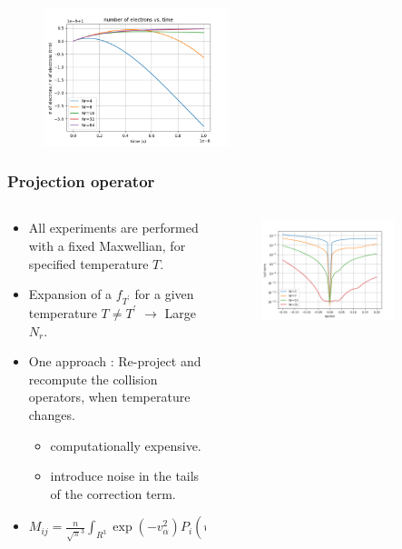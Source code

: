 \documentclass[mathserif, aspectratio=169]{beamer}
\begin{document}
\begin{frame}
\begin{figure}
{			}
			\only<+>
			{
				\includegraphics[width=0.48\textwidth]{g02_mw_mass.png}
			}
		\end{figure}
	\end{frame}


	\begin{frame}
		\frametitle{Projection operator}
		\begin{columns}
			\begin{column}{0.45\textwidth}
				\begin{itemize}
					\item All experiments are performed with a fixed Maxwellian, for specified temperature $T$. 
					\item Expansion of a $f_{T^\prime}$ for a given temperature $T\neq T^{\prime}$ $\rightarrow$ Large $N_r$. 
					\item One approach : Re-project and recompute the collision operators, when temperature changes. 
					\begin{itemize}
						\item computationally expensive. 
						\item introduce noise in the tails of the correction term. 
					\end{itemize}
					\item $M_{ij} = \frac{n}{\sqrt{\pi}^{3}}  \int_{R^3}  \exp(-v_\alpha^2) P_i (v_\alpha (1 + \frac{\epsilon}{\beta})) P_j(v_\alpha) \frac{dv}{\alpha}$
				\end{itemize} 
			\end{column}	
			\begin{column}{0.6\textwidth}
				\begin{figure}
					\only<+>
					{
						\includegraphics[width=0.8\textwidth]{../fig/basis_1ev_tail.png}
}
\end{figure}
\end{column}
\end{columns}
\end{frame}
\end{document}
